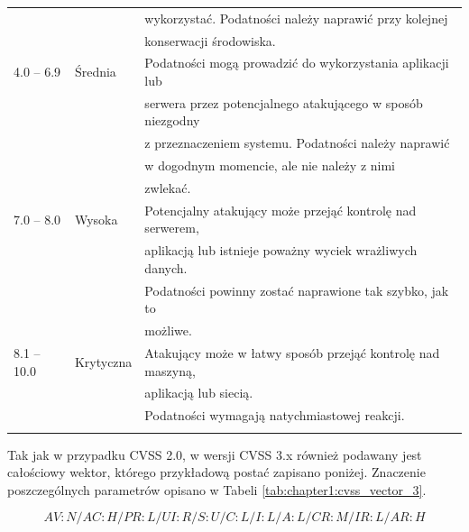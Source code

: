 \begin{table}[tbh]
\begin{center}
\begin{tabular}{lll}
           &              & wykorzystać. Podatności należy naprawić przy kolejnej      \\
           &              & konserwacji środowiska. \\
\hline
4.0 – 6.9  & Średnia      & Podatności mogą prowadzić do wykorzystania aplikacji lub \\
           &              & serwera przez potencjalnego atakującego w sposób niezgodny \\ 
           &              & z przeznaczeniem systemu. Podatności należy naprawić \\
           &              & w dogodnym momencie, ale nie należy z nimi \\
           &              & zwlekać. \\
\hline
7.0 – 8.0  & Wysoka       & Potencjalny atakujący może przejąć kontrolę nad serwerem, \\
           &              & aplikacją lub istnieje poważny wyciek wrażliwych danych. \\
           &              & Podatności powinny zostać naprawione tak szybko, jak to   \\
           &              & możliwe.\\
\hline
8.1 – 10.0 & Krytyczna    & Atakujący może w łatwy sposób przejąć kontrolę nad maszyną, \\ 
           &              & aplikacją lub siecią. \\
           &              & Podatności wymagają natychmiastowej reakcji.\\
\hline \noalign {\smallskip}
\end{tabular}
\end{center}
\end{table}

\bigbreak
Tak jak w przypadku CVSS 2.0, w wersji CVSS 3.x również podawany jest całościowy wektor, którego przykładową postać zapisano poniżej. Znaczenie poszczególnych parametrów opisano w Tabeli \ref{tab:chapter1:cvss_vector_3}.

\begin{equation}
\label{eq:chapter1:cvss_2_vector}
AV:N/AC:H/PR:L/UI:R/S:U/C:L/I:L/A:L/CR:M/IR:L/AR:H
\end{equation}

